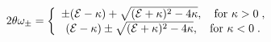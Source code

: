 \begin{equation}
 {2\theta\omega_\pm}=\left\{
 \begin{array}{c}
  \pm({\cal E}-\kappa)+\sqrt{({\cal E}+
\kappa)^2-4\kappa},\quad \mbox{for }
  \kappa>0\; ,\\
  ({\cal E}-\kappa)\pm
  \sqrt{({\cal E}+\kappa)^2-4\kappa},\quad \mbox{for }
  \kappa<0  \; .
 \end{array}\right.
\end{equation}

